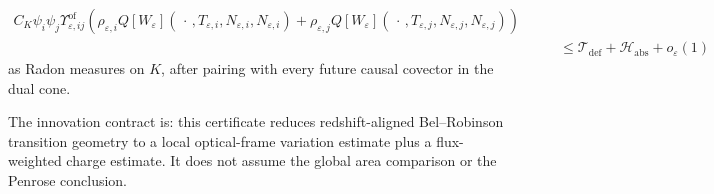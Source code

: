 \begin{definition}
\begin{enumerate}
\[\begin{split}
        C_K\psi_i\psi_j\Upsilon^{\mathrm{of}}_{\varepsilon,ij}
        \left(
            \rho_{\varepsilon,i}Q[W_\varepsilon](\,\cdot\,,T_{\varepsilon,i},N_{\varepsilon,i},N_{\varepsilon,i})
            +
            \rho_{\varepsilon,j}Q[W_\varepsilon](\,\cdot\,,T_{\varepsilon,j},N_{\varepsilon,j},N_{\varepsilon,j})
        \right) \\
        &\qquad\le
        \mathcal T_{\mathrm{def}}+\mathcal H_{\mathrm{abs}}+o_\varepsilon(1)
    \end{split}
    \]
    as Radon measures on $K$, after pairing with every future causal covector in the dual cone.
\end{enumerate}
The innovation contract is: this certificate reduces redshift-aligned Bel--Robinson transition geometry to a local optical-frame variation estimate plus a flux-weighted charge estimate.  It does not assume the global area comparison or the Penrose conclusion.
\end{definition}

